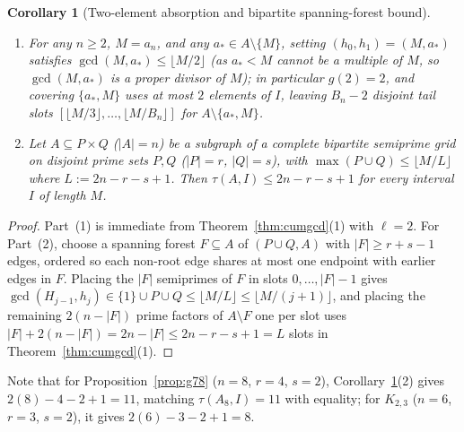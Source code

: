 \documentclass[11pt]{article}
\newtheorem{corollary}[theorem]{Corollary}
\begin{document}
\begin{corollary}[Two-element absorption and bipartite spanning-forest bound]
\label{cor:absorb}
\begin{enumerate}
\item For any $n \ge 2$, $M = a_n$, and any $a_* \in A \setminus \{M\}$, setting $(h_0, h_1) = (M, a_*)$ satisfies $\gcd(M, a_*) \le \lfloor M / 2 \rfloor$ (as $a_* < M$ cannot be a multiple of $M$, so $\gcd(M, a_*)$ is a proper divisor of $M$); in particular $g(2) = 2$, and covering $\{a_*, M\}$ uses at most $2$ elements of $I$, leaving $B_n - 2$ disjoint tail slots $[\lfloor M / 3 \rfloor, \dots, \lfloor M / B_n \rfloor]$ for $A \setminus \{a_*, M\}$.
\item Let $A \subseteq P \times Q$ ($|A| = n$) be a subgraph of a complete bipartite semiprime grid on disjoint prime sets $P, Q$ ($|P| = r$, $|Q| = s$), with $\max(P \cup Q) \le \lfloor M / L \rfloor$ where $L := 2n - r - s + 1$. Then $\tau(A, I) \le 2n - r - s + 1$ for every interval $I$ of length $M$.
\end{enumerate}
\end{corollary}
\begin{proof}
Part~(1) is immediate from Theorem~\ref{thm:cumgcd}(1) with $\ell = 2$. For Part~(2), choose a spanning forest $F \subseteq A$ of $(P \cup Q, A)$ with $|F| \ge r + s - 1$ edges, ordered so each non-root edge shares at most one endpoint with earlier edges in $F$. Placing the $|F|$ semiprimes of $F$ in slots $0, \dots, |F| - 1$ gives $\gcd(H_{j - 1}, h_j) \in \{1\} \cup P \cup Q \le \lfloor M / L \rfloor \le \lfloor M / (j + 1) \rfloor$, and placing the remaining $2(n - |F|)$ prime factors of $A \setminus F$ one per slot uses $|F| + 2(n - |F|) = 2n - |F| \le 2n - r - s + 1 = L$ slots in Theorem~\ref{thm:cumgcd}(1).
\end{proof}

Note that for Proposition~\ref{prop:g78} ($n = 8$, $r = 4$, $s = 2$), Corollary~\ref{cor:absorb}(2) gives $2(8) - 4 - 2 + 1 = 11$, matching $\tau(A_8, I) = 11$ with equality; for $K_{2, 3}$ ($n = 6$, $r = 3$, $s = 2$), it gives $2(6) - 3 - 2 + 1 = 8$.
\end{document}
